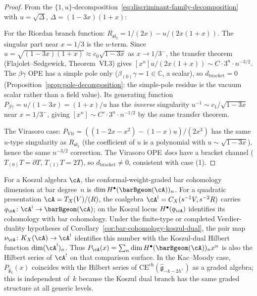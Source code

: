 \begin{proof}
From the $\{1, u\}$-decomposition~\eqref{eq:discriminant-family-decomposition}
with $u = \sqrt{\Delta}$, $\Delta = (1{-}3x)(1{+}x)$:

For the Riordan branch function:
$R_{\mathfrak{sl}_2} = 1/(2x) - u/(2x(1{+}x))$.
The singular part near $x = 1/3$ is the $u$-term. Since
$u = \sqrt{(1{-}3x)(1{+}x)} \approx c_0\sqrt{1{-}3x}$ as $x \to 1/3^-$,
the transfer theorem (Flajolet--Sedgewick, Theorem~VI.3) gives
$[x^n] u/(2x(1{+}x)) \sim C \cdot 3^n \cdot n^{-3/2}$.
The $\beta\gamma$ OPE has a simple pole only
($\beta_{(0)}\gamma = 1 \in \mathbb{C}$, a scalar),
so $d_{\mathrm{bracket}} = 0$
(Proposition~\ref{prop:pole-decomposition}: the simple-pole residue is
the vacuum scalar rather than a field value).
Its generating function $P_{\beta\gamma} = u/(1{-}3x) = (1{+}x)/u$
has the \emph{inverse} singularity $u^{-1} \sim c_1 / \sqrt{1{-}3x}$
near $x = 1/3^-$, giving $[x^n] \sim C' \cdot 3^n \cdot n^{-1/2}$
by the same transfer theorem.

The Virasoro case: $P_{\mathrm{Vir}} = ((1{-}2x{-}x^2) - (1{-}x)u)/(2x^3)$
has the same $u$-type singularity as $R_{\mathfrak{sl}_2}$
(the coefficient of $u$ is a polynomial with $u \sim \sqrt{1{-}3x}$),
hence the same $n^{-3/2}$ correction.
The Virasoro OPE \emph{does} have a bracket channel
($T_{(0)}T = \partial T$, $T_{(1)}T = 2T$),
so $d_{\mathrm{bracket}} \neq 0$, consistent with case (1).
\end{proof}

\begin{remark}\label{rem:bar-hilbert-koszul-dual}
For a Koszul algebra $\cA$, the conformal-weight-graded bar cohomology
dimension at bar degree~$n$ is
$\dim H^\bullet(\barBgeom(\cA))_n$.  For a quadratic presentation
$\cA=T_X(V)/(R)$, the coalgebra
$\cA^{\mathrm i}=C_X(s^{-1}V,s^{-2}R)$ carries
$q_\cA\colon\cA^{\mathrm i}\to\barBgeom(\cA)$; on the Koszul locus
$H^\bullet(q_\cA)$ identifies its cohomology with bar cohomology.
Under the finite-type or completed Verdier-duality hypotheses of
Corollary~\ref{cor:bar-cohomology-koszul-dual}, the pair map
$\nu_\cA\colon K_X(\cA)\to\cA^!$ identifies this number with the
Koszul-dual Hilbert function $\dim(\cA^!)_n$.  Thus
$P_{\cA}(x)=\sum_n\dim H^\bullet(\barBgeom(\cA))_n x^n$ is also the
Hilbert series of $\cA^!$ on that comparison surface. In the Kac--Moody case,
$P_{\widehat{\mathfrak{g}}_k}(x)$ coincides with the Hilbert series of
$\mathrm{CE}^{\mathrm{ch}}(\widehat{\mathfrak{g}}_{-k-2h^\vee})$ as a
graded algebra; this is independent of~$k$ because the Koszul dual branch
has the same graded structure at all generic levels.
\end{remark}

